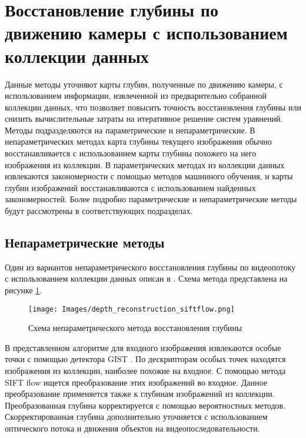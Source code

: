 \documentclass{mipt-thesis-bs}
\begin{document}
\section{Восстановление глубины по движению камеры с использованием коллекции данных}
Данные методы уточняют карты глубин, полученные по движению камеры, с использованием информации, извлеченной из предварительно собранной коллекции данных, что позволяет повысить точность восстановления глубины или снизить вычислительные затраты на итеративное решение систем уравнений.\\
Методы подразделяются на параметрические и непараметрические. В непараметрических методах карта глубины текущего изображения обычно восстанавливается с использованием карты глубины похожего на него изображения из коллекции. В параметрических методах из коллекции данных извлекаются закономерности с помощью методов машинного обучения, и карты глубин изображений восстанавливаются с использованием найденных закономерностей. Более подробно параметрические и непараметрические методы будут рассмотрены в соответствующих подразделах.\\

\subsection{Непараметрические методы}
Один из вариантов непараметрического восстановления глубины по видеопотоку с использованием коллекции данных описан в \cite{karsch2014depth}. Схема метода представлена на рисунке \ref{figurenonparametric}.

\begin{figure}
	\centering
	\texttt{[image: Images/depth\_reconstruction\_siftflow.png]}
	\caption{Схема непараметрического метода восстановления глубины}
	\label{figurenonparametric}
\end{figure}

В представленном алгоритме для входного изображения извлекаются особые точки с помощью детектора GIST \cite{oliva2001modeling}. По дескрипторам особых точек находятся изображения из коллекции, наиболее похожие на входное. С помощью метода SIFT flow \cite{liu2010sift} ищется преобразование этих изображений во входное. Данное преобразование применяется также к глубинам изображений из коллекции. Преобразованная глубина корректируется с помощью вероятностных методов. Скорректированная глубина дополнительно уточняется с использованием оптического потока и движения объектов на видеопоследовательности.\\
\end{document}
